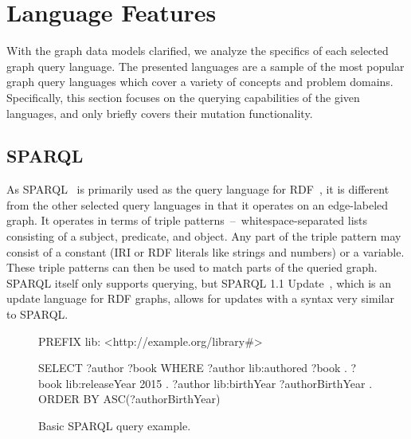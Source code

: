 \section{Language Features}

With the graph data models clarified, we analyze the specifics of each selected graph query language.
The presented languages are a sample of the most popular graph query languages which cover a variety of concepts and problem domains.
Specifically, this section focuses on the querying capabilities of the given languages, and only briefly covers their mutation functionality.

\subsection{SPARQL}
\label{querylanguages:subsection:sparql}

As SPARQL~\cite{sparql} is primarily used as the query language for RDF~\cite{rdf}, it is different from the other selected query languages in that it operates on an edge-labeled graph.
It operates in terms of triple patterns~--~whitespace-separated lists consisting of a subject, predicate, and object.
Any part of the triple pattern may consist of a constant (IRI or RDF literals like strings and numbers) or a variable.
These triple patterns can then be used to match parts of the queried graph.
SPARQL itself only supports querying, but SPARQL 1.1 Update~\cite{sparql_update}, which is an update language for RDF graphs, allows for updates with a syntax very similar to SPARQL.

\begin{figure}[ht]
\begin{code}[]
PREFIX lib: <http://example.org/library#>

SELECT ?author ?book
WHERE
{
    ?author lib:authored    ?book .
    ?book   lib:releaseYear 2015  .
    ?author lib:birthYear   ?authorBirthYear .
}
ORDER BY ASC(?authorBirthYear)
\end{code}
\caption{Basic SPARQL query example.}
\label{fig:sparqlbasic}
\end{figure}

